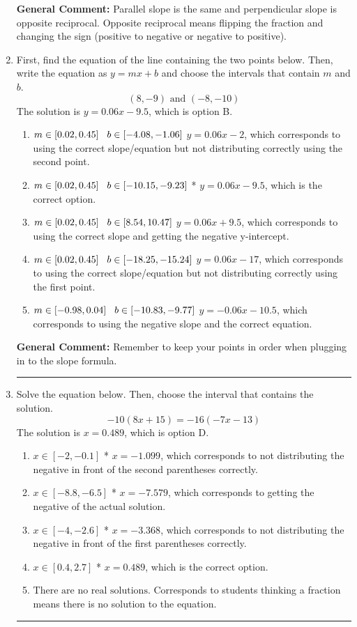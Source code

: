 \documentclass{extbook}[14pt]
\newcommand{\litem}[1]{\item #1

\rule{\textwidth}{0.4pt}}
\begin{document}
\begin{enumerate}
{\textbf{General Comment:} Parallel slope is the same and perpendicular slope is opposite reciprocal. Opposite reciprocal means flipping the fraction and changing the sign (positive to negative or negative to positive).
}
\litem{
First, find the equation of the line containing the two points below. Then, write the equation as $ y=mx+b $ and choose the intervals that contain $m$ and $b$.
\[ (8, -9) \text{ and } (-8, -10) \]
The solution is \( y = 0.06x -9.5 \), which is option B.\begin{enumerate}[label=\Alph*.]
\item \( m \in [0.02, 0.45] \hspace*{3mm} b \in [-4.08, -1.06] \)
 $y = 0.06x -2$, which corresponds to using the correct slope/equation but not distributing correctly using the second point.
\item \( m \in [0.02, 0.45] \hspace*{3mm} b \in [-10.15, -9.23] \)
* $y = 0.06x -9.5$, which is the correct option.
\item \( m \in [0.02, 0.45] \hspace*{3mm} b \in [8.54, 10.47] \)
 $y = 0.06x + 9.5$, which corresponds to using the correct slope and getting the negative y-intercept.
\item \( m \in [0.02, 0.45] \hspace*{3mm} b \in [-18.25, -15.24] \)
 $y = 0.06x -17$, which corresponds to using the correct slope/equation but not distributing correctly using the first point.
\item \( m \in [-0.98, 0.04] \hspace*{3mm} b \in [-10.83, -9.77] \)
 $y = -0.06x -10.5$, which corresponds to using the negative slope and the correct equation.
\end{enumerate}

\textbf{General Comment:} Remember to keep your points in order when plugging in to the slope formula.
}
\litem{
Solve the equation below. Then, choose the interval that contains the solution.
\[ -10(8x + 15) = -16(-7x -13) \]
The solution is \( x = 0.489 \), which is option D.\begin{enumerate}[label=\Alph*.]
\item \( x \in [-2, -0.1] \)
* $x = -1.099$, which corresponds to not distributing the negative in front of the second parentheses correctly.
\item \( x \in [-8.8, -6.5] \)
* $x = -7.579$, which corresponds to getting the negative of the actual solution.
\item \( x \in [-4, -2.6] \)
* $x = -3.368$, which corresponds to not distributing the negative in front of the first parentheses correctly.
\item \( x \in [0.4, 2.7] \)
* $x = 0.489$, which is the correct option.
\item \( \text{There are no real solutions.} \)
Corresponds to students thinking a fraction means there is no solution to the equation.
\end{enumerate}

}
\end{enumerate}
\end{document}
